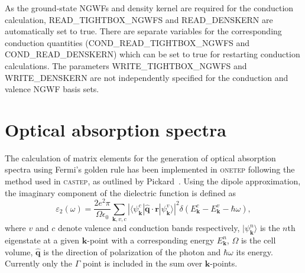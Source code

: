\documentclass[a4paper,oneside,11pt]{article}
\begin{document}
As the ground-state NGWFs and density kernel are required for the conduction calculation, READ\_TIGHTBOX\_NGWFS and  READ\_DENSKERN are automatically set to true.  There are separate variables for the corresponding conduction quantities (COND\_READ\_TIGHTBOX\_NGWFS and COND\_READ\_DENSKERN) which can be set to true for restarting conduction calculations.  The parameters WRITE\_TIGHTBOX\_NGWFS and WRITE\_DENSKERN are not independently specified for the conduction and valence NGWF basis sets.

\section*{Optical absorption spectra}

The calculation of matrix elements for the generation of optical absorption spectra using Fermi's golden rule has been implemented in \textsc{onetep} following the method used in \textsc{castep}, as outlined by Pickard~\cite{pickard}.  Using the dipole approximation, the imaginary component of the dielectric function is defined as
%
\begin{equation} \label{eq:imag_diel}
\varepsilon_2\left(\omega\right)=\frac{2e^2\pi}{\Omega\epsilon_0}\sum_{\mathbf{k},v,c}\left|\langle\psi_{\mathbf{k}}^{c}|\mathbf{\hat{q}}\cdot\mathbf{r}|\psi_{\mathbf{k}}^{v}\rangle\right|^2\delta\left(E_{\mathbf{k}}^{c}-E_{\mathbf{k}}^{v}-\hbar\omega\right) ,
\end{equation}
%
where $v$ and $c$ denote valence and conduction bands respectively, $|\psi_{\mathbf{k}}^{n}\rangle$ is the $n$th eigenstate at a given $\mathbf{k}$-point with a corresponding energy $E_{\mathbf{k}}^n$, $\Omega$ is the cell volume, $\mathbf{\hat{q}}$ is the direction of polarization of the photon and $\hbar\omega$ its energy.  Currently only the $\Gamma$ point is included in the sum over $\mathbf{k}$-points.
\end{document}
